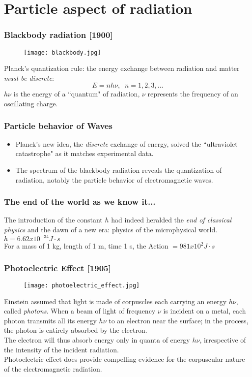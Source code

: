 \documentclass[10pt]{beamer}
\begin{document}
\section{Particle aspect of radiation}

\begin{frame}
\frametitle{Blackbody radiation [1900]}
\begin{figure}
\texttt{[image: blackbody.jpg]}
\end{figure}
\pause Planck’s quantization rule: the energy exchange between radiation and matter \emph{must be discrete}:
\begin{equation*}
	E = n h \nu, \; \; n = 1, 2, 3, ...
\end{equation*}
\pause $h \nu$ is the energy of a ``quantum" of radiation, $\nu$ represents the frequency of an oscillating charge.
\end{frame}

\begin{frame}
\frametitle{Particle behavior of Waves}
\begin{itemize}
\item Planck's new idea, the \emph{discrete} exchange of energy, solved the ``ultraviolet catastrophe" as it matches experimental data.
\item The spectrum of the blackbody radiation reveals the quantization of radiation, notably the particle behavior of electromagnetic waves.
\end{itemize}
\end{frame}

\begin{frame}
\frametitle{The end of the world as we know it...}
The introduction of the constant \alert{$h$} had indeed heralded the \emph{end of classical physics} and the dawn of a new era: physics of the microphysical world.
\newline
\newline
\pause $h = 6.62 x 10^{-34} J \cdot s$\\
For a mass of 1 kg, length of 1 m, time 1 s, the Action $ = 981 x 10^2 J \cdot s$
\end{frame}

\begin{frame}
\frametitle{Photoelectric Effect [1905]}
\begin{figure}
\texttt{[image: photoelectric\_effect.jpg]}
\end{figure}
Einstein assumed that light is made of corpuscles each carrying an energy $h\nu$, called \emph{photons}. 
\pause When a beam of light of frequency $\nu$ is incident on a metal, each
photon transmits all its energy $h\nu$ to an electron near the surface; in the process, the photon is entirely absorbed by the electron.\\ 
\pause The electron will thus absorb energy only in quanta of energy $h\nu$, irrespective of the intensity of the incident radiation.\\
\pause Photoelectric effect does provide compelling evidence for the corpuscular
nature of the electromagnetic radiation.
\end{frame}
\end{document}
